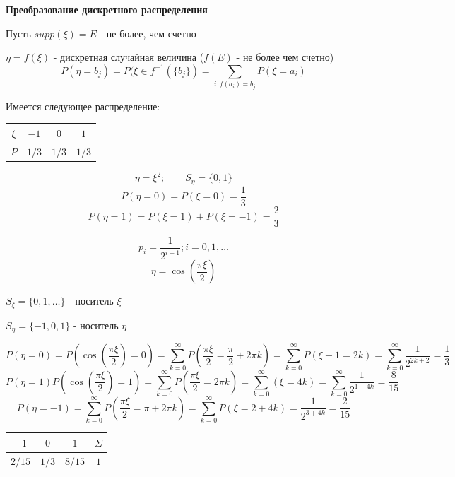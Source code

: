 \noindent \textbf{Преобразование дискретного распределения}

Пусть $supp(\xi)=E$ - не более, чем счетно

\noindent $\eta=f(\xi)$ - дискретная случайная величина ($f(E)$ - не более чем счетно)
\[P(\eta = b_j) = P(\xi \in f^{-1}(\{b_j\}) = \sum\limits_{i:f(a_i)=b_j} P(\xi = a_i) \]

\begin{exmp}
	Имеется следующее распределение:
	\begin{table}[H]
		\centering
		\begin{tabular}{|c|c|c|c|}
			\hline
			$\xi$ & $-1$  & $0$   & $1$   \\ \hline
			$P$   & $1/3$ & $1/3$ & $1/3$ \\ \hline
		\end{tabular}
	\end{table}
	\[ \eta = \xi^2; ~~~~~~~~~ S_{\eta} = \{0,1\} \]
	\[ P(\eta = 0) = P(\xi = 0) = \frac{1}{3} \]
	\[ P(\eta = 1) = P(\xi = 1) + P(\xi = -1) = \frac{2}{3} \]
\end{exmp}

\begin{exmp}
	\[ p_i = \frac{1}{2^{i + 1}}; i = 0,1,\dots \]
	\[ \eta = \cos \left( \frac{\pi \xi}{2} \right) \]
	
	\noindent $S_{\xi} = \{ 0,1,\dots \}$ - носитель $\xi$
	
	\noindent $S_{\eta} = \{ -1,0,1 \}$ - носитель $\eta$
	
	\[ P(\eta = 0) = P \left( \cos \left( \frac{\pi \xi}{2} \right) = 0 \right) = \sum_{k=0}^{\infty} P \left( \frac{\pi \xi}{2} = \frac{\pi}{2} + 2 \pi k \right) = \sum_{k=0}^{\infty} P (\xi + 1 = 2k) = \sum_{k=0}^{\infty} \frac{1}{2^{2k+2}} = \frac{1}{3} \]
	\[ P(\eta = 1) P \left( \cos \left( \frac{\pi \xi}{2} \right) = 1 \right) = \sum_{k=0}^{\infty} P \left( \frac{\pi \xi}{2} = 2 \pi k \right) = \sum_{k=0}^{\infty} (\xi = 4k) = \sum_{k=0}^{\infty} \frac{1}{2^{1 + 4k}} = \frac{8}{15} \]
	\[ P(\eta = -1) = \sum_{k=0}^{\infty} P \left( \frac{\pi \xi}{2} = \pi + 2 \pi k \right) = \sum_{k=0}^{\infty} P (\xi = 2 + 4k) = \frac{1}{2^{3 + 4k}} = \frac{2}{15} \]
	\begin{table}[H]
		\centering
		\begin{tabular}{|c|c|c|c|}
			\hline
			$-1$   & $0$   & $1$    & $\Sigma$ \\ \hline
			$2/15$ & $1/3$ & $8/15$ & $1$      \\ \hline
		\end{tabular}
	\end{table}
\end{exmp}

